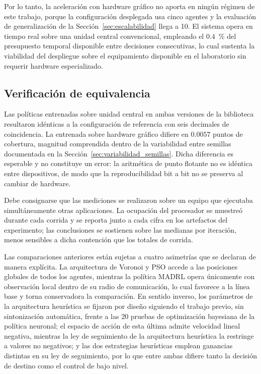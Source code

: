 Por lo tanto, la aceleración con hardware gráfico no aporta en ningún régimen de este trabajo, porque la configuración desplegada usa cinco agentes y la evaluación de generalización de la Sección~\ref{sec:escalabilidad} llega a 10. El sistema opera en tiempo
real sobre una unidad central convencional, empleando el $0{.}4$~\% del
presupuesto temporal disponible entre decisiones consecutivas, lo cual sustenta
la viabilidad del despliegue sobre el equipamiento disponible en el laboratorio
sin requerir hardware especializado.

\subsection*{Verificación de equivalencia}

Las políticas entrenadas sobre unidad central en ambas versiones de la
biblioteca resultaron idénticas a la configuración de referencia con seis
decimales de coincidencia. La entrenada sobre hardware gráfico difiere en
$0{.}0057$ puntos de cobertura, magnitud comprendida dentro de la variabilidad
entre semillas documentada en la Sección~\ref{sec:variabilidad_semillas}. Dicha
diferencia es esperable y no constituye un error: la aritmética de punto
flotante no es idéntica entre dispositivos, de modo que la reproducibilidad bit
a bit no se preserva al cambiar de hardware.

Debe consignarse que las mediciones se realizaron sobre un equipo que ejecutaba
simultáneamente otras aplicaciones. La ocupación del procesador se muestreó
durante cada corrida y se reporta junto a cada cifra en los artefactos del
experimento; las conclusiones se sostienen sobre las medianas por iteración,
menos sensibles a dicha contención que los totales de corrida.

Las comparaciones anteriores están sujetas a cuatro asimetrías que se declaran
de manera explícita. La arquitectura de Voronoi y PSO accede a las posiciones
globales de todos los agentes, mientras la política MADRL opera únicamente con
observación local dentro de su radio de comunicación, lo cual favorece a la
línea base y torna conservadora la comparación. En sentido inverso, los
parámetros de la arquitectura heurística se fijaron por diseño siguiendo el
trabajo previo, sin sintonización automática, frente a las 20 pruebas de
optimización bayesiana de la política neuronal; el espacio de acción de esta
última admite velocidad lineal negativa, mientras la ley de seguimiento de la
arquitectura heurística la restringe a valores no negativos; y las dos
estrategias heurísticas emplean ganancias distintas en su ley de seguimiento,
por lo que entre ambas difiere tanto la decisión de destino como el control de
bajo nivel.

